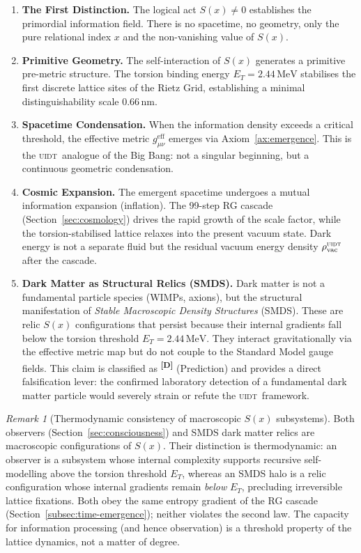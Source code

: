 \documentclass[12pt,a4paper,twoside]{article}
\theoremstyle{plain}
\theoremstyle{definition}
\theoremstyle{remark}
\newtheorem{remark}[theorem]{Remark}
\newcommand{\UIDT}{\textsc{uidt}}
\newcommand{\MeV}{\,\mathrm{MeV}}
\newcommand{\catmark}[1]{\textsuperscript{\textsf{\textbf{[#1]}}}}
\newcommand{\ETorsion}{2.44\MeV}                    %
\newcommand{\LambdaGrid}{0.66\,\mathrm{nm}}         %
\begin{document}
\begin{enumerate}
  \item \textbf{The First Distinction.} The logical act $S(x) \neq 0$ establishes
    the primordial information field. There is no spacetime, no geometry, only
    the pure relational index $x$ and the non-vanishing value of $S(x)$.
  \item \textbf{Primitive Geometry.} The self-interaction of $S(x)$ generates
    a primitive pre-metric structure. The torsion binding energy $E_T = \ETorsion$
    stabilises the first discrete lattice sites of the Rietz Grid, establishing
    a minimal distinguishability scale $\LambdaGrid$.
  \item \textbf{Spacetime Condensation.} When the information density exceeds a
    critical threshold, the effective metric $g_{\mu\nu}^{\mathrm{eff}}$ emerges
    via Axiom~\ref{ax:emergence}. This is the \UIDT\ analogue of the Big Bang:
    not a singular beginning, but a continuous geometric condensation.
  \item \textbf{Cosmic Expansion.} The emergent spacetime undergoes a mutual
    information expansion (inflation). The 99-step RG cascade
    (Section~\ref{sec:cosmology}) drives the rapid growth of the scale factor,
    while the torsion-stabilised lattice relaxes into the present vacuum state.
    Dark energy is not a separate fluid but the residual vacuum energy density
    $\rho_{\mathrm{vac}}^{\UIDT}$ after the cascade.
  \item \textbf{Dark Matter as Structural Relics (SMDS).} Dark matter is not a
    fundamental particle species (WIMPs, axions), but the structural manifestation
    of \textit{Stable Macroscopic Density Structures} (SMDS). These are relic $S(x)$
    configurations that persist because their internal gradients fall below the
    torsion threshold $E_T = \ETorsion$. They interact gravitationally via the
    effective metric map but do not couple to the Standard Model gauge fields.
    This claim is classified as \catmark{D} (Prediction) and provides a direct
    falsification lever: the confirmed laboratory detection of a fundamental
    dark matter particle would severely strain or refute the \UIDT\ framework.
\end{enumerate}

\begin{remark}[Thermodynamic consistency of macroscopic $S(x)$ subsystems]
Both observers (Section~\ref{sec:consciousness}) and SMDS dark matter
relics are macroscopic configurations of $S(x)$. Their distinction is
thermodynamic: an observer is a subsystem whose internal complexity
supports recursive self-modelling above the torsion threshold $E_T$,
whereas an SMDS halo is a relic configuration whose internal gradients
remain \emph{below} $E_T$, precluding irreversible lattice fixations.
Both obey the same entropy gradient of the RG cascade
(Section~\ref{subsec:time-emergence}); neither violates the second law.
The capacity for information processing (and hence observation) is a
threshold property of the lattice dynamics, not a matter of degree.
\end{remark}
\end{document}
